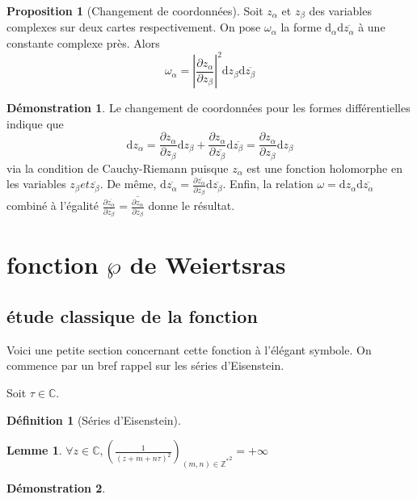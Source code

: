 \documentclass{article}
\newcommand{\C}{\mathbb{C}} %
\newcommand{\Z}{\mathbb{Z}} %
\theoremstyle{definition} %
\newtheorem{defi}{Définition}
\newtheorem{lem}{Lemme}
\newtheorem{prop}{Proposition}
\newtheorem{dem}{Démonstration}
\newcommand{\derp}[2]{\frac{\partial {#1}}{\partial {#2}}}
\newcommand{\dd}{ \mathrm{d}}
\newcommand{\1}{\mathbb{1}} %
\begin{document}
\begin{prop}[Changement de coordonnées]
Soit $z_\alpha$ et $z_\beta$ des variables complexes sur deux cartes respectivement.
On pose $\omega_\alpha$ la forme $\dd_\alpha \dd \overline{z_\alpha}$ à une constante complexe près.
Alors 
$$\omega_\alpha=|\frac{\partial z_\alpha}{\partial z_\beta}|^2 \dd z_\beta \dd \overline{z_\beta}$$
\end{prop}

\begin{dem}
Le changement de coordonnées pour les formes différentielles indique que
$$\dd z_\alpha = \derp{z_\alpha}{z_\beta} \dd z_\beta + \derp{z_\alpha}{\overline{z_\beta}} \dd \overline{z_\beta}=\derp{z_\alpha}{z_\beta} \dd z_\beta$$ via la condition de Cauchy-Riemann puisque $z_\alpha$ est une fonction holomorphe en les variables $z_\beta et \overline{z_\beta}$.
De même, $\dd \overline{z_\alpha}= \derp{\overline{z_\alpha}}{\overline{z_\beta}} \dd \overline{z_\beta}$.
Enfin, la relation $\omega = \dd z_\alpha \dd \overline{z_\alpha}$ combiné à l'égalité $\derp{\overline{z_\alpha}}{\overline{z_\beta}}=\overline{\frac{\partial z_\alpha}{\partial z_\beta}}$ donne le résultat.

\end{dem}


\section{fonction $\wp$ de Weiertsras}

\subsection{étude classique de la fonction}

Voici une petite section concernant cette fonction à l'élégant symbole.
On commence par un bref rappel sur les séries d'Eisenstein.

Soit $\tau \in \C$.

\begin{defi}[Séries d'Eisenstein]

\end{defi}

\begin{lem}
$\forall z \in \C, \left( \frac{1}{(z + m + n \tau)^2} \right)_{(m,n)\in {\Z^*}^2} = +\infty$ 
\end{lem}

\begin{dem}
\end{dem}
\end{document}
